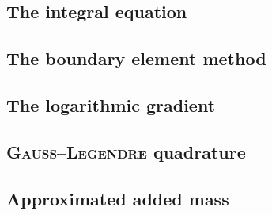 \subsection{The integral equation}


\subsection{The boundary element method}


\subsection{The logarithmic gradient}


\subsection{\textsc{Gauss}--\textsc{Legendre} quadrature}


\subsection{Approximated added mass}

